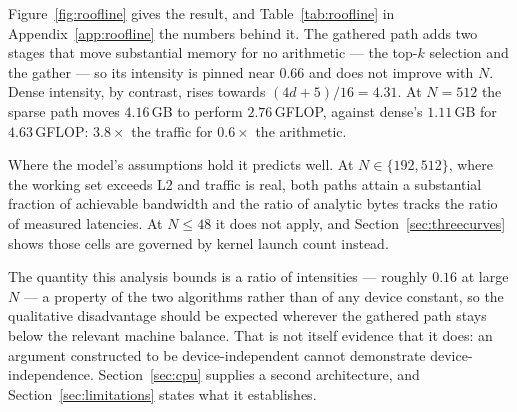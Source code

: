 Figure~\ref{fig:roofline} gives the result, and Table~\ref{tab:roofline} in
Appendix~\ref{app:roofline} the numbers behind it. The
gathered path adds two stages that move substantial memory for no arithmetic
--- the top-$k$ selection and the gather --- so its intensity is pinned near
$0.66$ and does not improve with $N$. Dense intensity, by contrast, rises towards $(4d{+}5)/16 = 4.31$. At $N{=}512$ the sparse path moves $4.16$\,GB to perform
$2.76$\,GFLOP, against dense's $1.11$\,GB for $4.63$\,GFLOP: $3.8\times$ the
traffic for $0.6\times$ the arithmetic.

Where the model's assumptions hold it predicts well. At $N \in \{192, 512\}$,
where the working set exceeds L2 and traffic is real, both paths attain a
substantial fraction of achievable bandwidth and the ratio of analytic bytes
tracks the ratio of measured latencies. At $N \le 48$ it does not
apply, and Section~\ref{sec:threecurves} shows those cells are governed by
kernel launch count instead.

The quantity this analysis bounds is a ratio of intensities --- roughly $0.16$
at large $N$ --- a property of the two algorithms rather than of any device
constant, so the qualitative disadvantage should be expected wherever the
gathered path stays below the relevant machine balance. That is not itself
evidence that it does: an argument constructed to be device-independent cannot
demonstrate device-independence. Section~\ref{sec:cpu} supplies a second
architecture, and Section~\ref{sec:limitations} states what it establishes.

